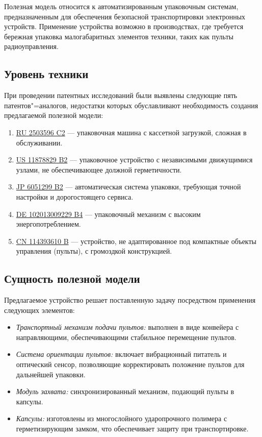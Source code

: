 \documentclass{bsuir}
\begin{document}
Полезная модель относится к автоматизированным упаковочным системам, предназначенным для обеспечения безопасной
транспортировки электронных устройств. Применение устройства возможно в производствах, где требуется бережная упаковка
малогабаритных элементов техники, таких как пульты радиоуправления.

\subsection*{Уровень техники}

При проведении патентных исследований были выявлены следующие пять патентов"=аналогов, недостатки которых обуславливают
необходимость создания предлагаемой полезной модели:

\begin{enumerate}
    \item \href{http://patents.google.com/patent/RU2503596C2}{RU 2503596 C2} --- упаковочная машина с кассетной
    загрузкой, сложная в обслуживании.
    \item \href{http://patents.google.com/patent/US11878829B2}{US 11878829 B2} --- упаковочное устройство с независимыми
    движущимися узлами, не обеспечивающее должной герметичности.
    \item \href{http://patents.google.com/patent/JP6051299B2}{JP 6051299 B2} --- автоматическая система упаковки,
    требующая точной настройки и дорогостоящего сервиса.
    \item \href{http://patents.google.com/patent/DE102013009229B4}{DE 102013009229 B4} --- упаковочный механизм с
    высоким энергопотреблением.
    \item \href{http://patents.google.com/patent/CN114393610B}{CN 114393610 B} --- устройство, не адаптированное под
    компактные объекты управления (пульты), с громоздкой конструкцией.
\end{enumerate}

\subsection*{Сущность полезной модели}

Предлагаемое устройство решает поставленную задачу посредством применения следующих элементов:
\begin{itemize}
    \item \textit{Транспортный механизм подачи пультов:} выполнен в виде конвейера с направляющими, обеспечивающими
    стабильное перемещение пультов.
    \item \textit{Система ориентации пультов:} включает вибрационный питатель и оптический сенсор, позволяющие
    корректировать положение пультов для дальнейшей упаковки.
    \item \textit{Модуль захвата:} синхронизированный механизм, подающий пульты в капсулы.
    \item \textit{Капсулы:} изготовлены из многослойного ударопрочного полимера с герметизирующим замком, что
    обеспечивает защиту при транспортировке.
\end{itemize}
\end{document}
